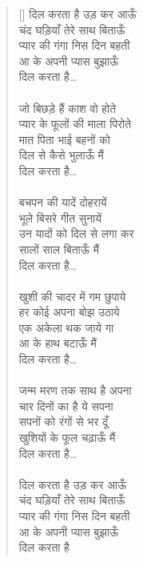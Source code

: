 \begin{verse}[\versewidth]\texthindi{
दिल करता है उड़ कर आऊँ\\
चंद घड़ियाँ तेरे साथ बिताऊँ\\
प्यार की गंगा निस दिन बहती\\
आ के अपनी प्यास बुझाऊँ\\
दिल करता है…\\
\\
जो बिछड़े हैं काश वो होते\\
प्यार के फूलों की माला पिरोते\\
मात पिता भाई बहनों को\\
दिल से कैसे भुलाऊँ मैं\\
दिल करता है…\\
\\
बचपन की यादें दोहरायें\\
भूले बिसरे गीत सुनायें\\
उन यादों को दिल से लगा कर\\
सालों साल बिताऊँ मैं\\
दिल करता है…\\
\\
खुशी की चादर में गम छुपाये\\
हर कोई अपना बोझ उठाये\\
एक अकेला थक जाये गा\\
आ के हाथ बटाऊँ मैं\\
दिल करता है…\\
\\
जन्म मरण तक साथ है अपना\\
चार दिनों का है ये सपना\\
सपनों को रंगों से भर दूँ\\
खुशियों के फूल चढ़ाऊँ मैं\\
दिल करता है…\\
\\
दिल करता है उड़ कर आऊँ\\
चंद घड़ियाँ तेरे साथ बिताऊँ\\
प्यार की गंगा निस दिन बहती\\
आ के अपनी प्यास बुझाऊँ\\
दिल करता है
}
\end{verse}

